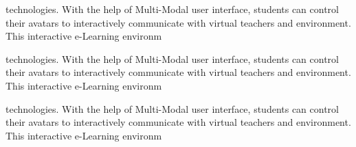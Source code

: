\documentclass{article}
\begin{document}
technologies. With the help of Multi-Modal user interface, students can control their avatars to interactively communicate with virtual teachers and environment. This interactive e-Learning environm \cite{ref_book1}

technologies. With the help of Multi-Modal user interface, students can control their avatars to interactively communicate with virtual teachers and environment. This interactive e-Learning environm \cite{hany2021}

technologies. With the help of Multi-Modal user interface, students can control their avatars to interactively communicate with virtual teachers and environment. This interactive e-Learning environm \cite{wang2021review,adoh1992cardiff}

 







 

\end{document}
